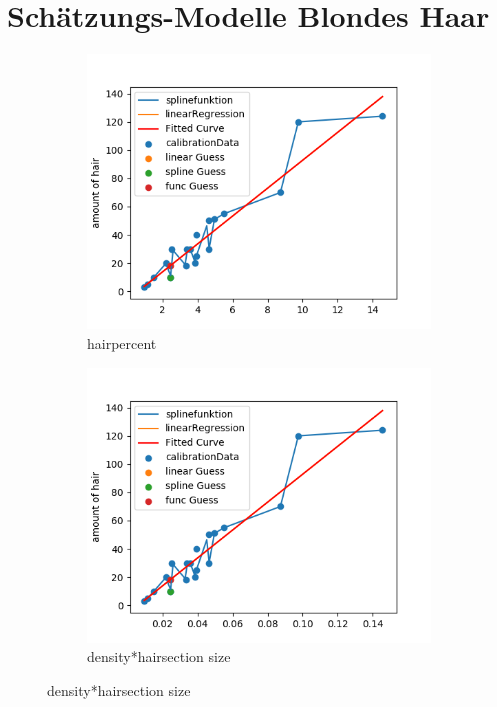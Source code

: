 \documentclass[german,a4paper, 12pt]{llncs}
\begin{document}
\section{Schätzungs-Modelle Blondes Haar}
\label{appendix:Blond}
\begin{figure}[H] %
	\begin{subfigure}{0.48\textwidth}
		\includegraphics[width=1.1\linewidth]{figBina/g1.png}
		\caption{hairpercent} \label{fig:a}
	\end{subfigure}\hspace*{\fill}
	\begin{subfigure}{0.48\textwidth}
		\includegraphics[width=1.1\linewidth]{figBina/g2.png}
		\caption{density*hairsection size} \label{fig:b}
	\end{subfigure}
	

\end{figure}
\end{document}
